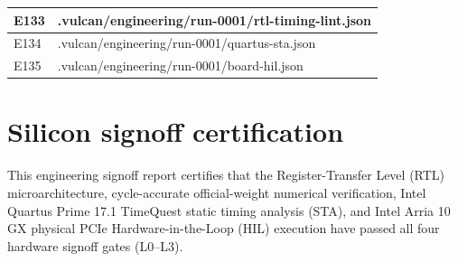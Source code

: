 \documentclass[11pt,a4paper]{article}
\begin{document}
{\begin{longtable}{@{}L{0.12\textwidth}|L{0.82\textwidth}@{}}
E133 & .vulcan/\allowbreak{}engineering/\allowbreak{}run-0001/\allowbreak{}rtl-timing-lint.json\\[2pt]\hline

E134 & .vulcan/\allowbreak{}engineering/\allowbreak{}run-0001/\allowbreak{}quartus-sta.json\\[2pt]\hline

E135 & .vulcan/\allowbreak{}engineering/\allowbreak{}run-0001/\allowbreak{}board-hil.json\\[2pt]\hline

\bottomrule\end{longtable}}

\section{Silicon signoff certification}

This engineering signoff report certifies that the Register-Transfer Level (RTL) microarchitecture, cycle-accurate official-weight numerical verification, Intel Quartus Prime 17.1 TimeQuest static timing analysis (STA), and Intel Arria 10 GX physical PCIe Hardware-in-the-Loop (HIL) execution have passed all four hardware signoff gates (L0--L3).
\end{document}
